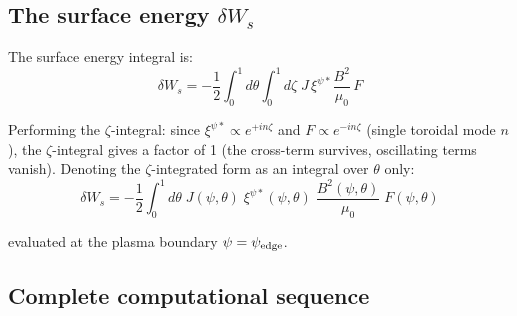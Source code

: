 \documentclass[12pt,a4paper]{article}
\begin{document}
\subsection{The surface energy $\delta W_s$}

The surface energy integral is:
\begin{equation}
    \delta W_s = -\frac{1}{2}\int_0^1 d\theta \int_0^1 d\zeta\;
    J\,\xi^{\psi*}\frac{B^2}{\mu_0}\,F
    \label{eq:dWs}
\end{equation}

Performing the $\zeta$-integral: since $\xi^{\psi*} \propto e^{+in\zeta}$ and $F \propto e^{-in\zeta}$ (single toroidal mode $n$), the $\zeta$-integral gives a factor of 1 (the cross-term survives, oscillating terms vanish). Denoting the $\zeta$-integrated form as an integral over $\theta$ only:
\begin{equation}
    \boxed{
    \delta W_s = -\frac{1}{2}\int_0^1 d\theta\;
    J(\psi,\theta)\;\xi^{\psi*}(\psi,\theta)\;\frac{B^2(\psi,\theta)}{\mu_0}\;F(\psi,\theta)
    }
    \label{eq:dWs_theta}
\end{equation}

evaluated at the plasma boundary $\psi = \psi_{\rm edge}$.

\subsection{Complete computational sequence}
\end{document}
